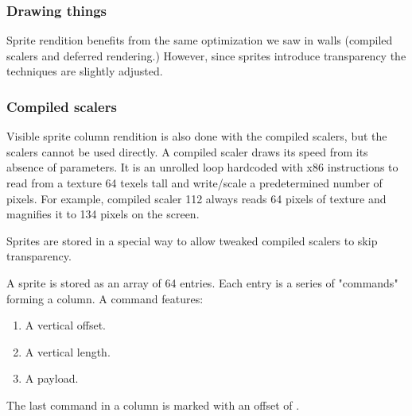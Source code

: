 \subsubsection{Drawing things}
Sprite rendition benefits from the same optimization we saw in walls (compiled scalers and deferred rendering.) However, since sprites introduce transparency the techniques are slightly adjusted.

\subsubsection{Compiled scalers}
Visible sprite column rendition is also done with the compiled scalers, but the scalers cannot be used directly. A compiled scaler draws its speed from its absence of parameters. It is an unrolled loop hardcoded with x86 instructions to read from a texture 64 texels tall and write/scale a predetermined number of pixels. For example, compiled scaler 112 always reads 64 pixels of texture and magnifies it to 134 pixels on the screen.\\
\par
Sprites are stored in a special way to allow tweaked compiled scalers to skip transparency.\\
\par
A sprite is stored as an array of 64 entries. Each entry is a series of "commands" forming a column. A command features:
\begin{enumerate}
 \item A vertical offset.
 \item A vertical length.
 \item A payload.
 \end{enumerate}
\par
The last command in a column is marked with an offset of .\\
\par

